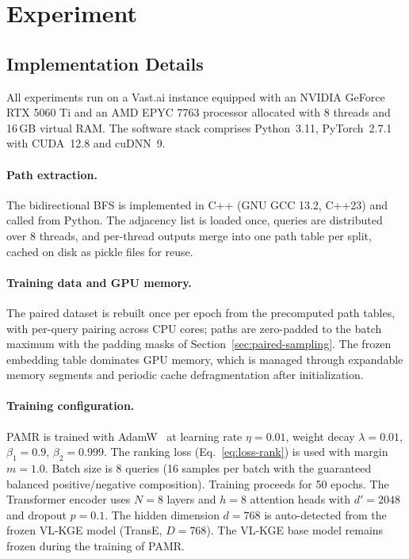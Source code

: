 \documentclass[runningheads]{llncs}
\begin{document}
\section{Experiment}
\label{sec:experiment}
\subsection{Implementation Details}
\label{sec:implementation}

All experiments run on a Vast.ai instance equipped with an NVIDIA
GeForce RTX 5060 Ti and an AMD EPYC 7763 processor allocated with 8 threads
and 16\,GB virtual RAM. The software stack comprises Python~3.11,
PyTorch~2.7.1 with CUDA~12.8 and cuDNN~9.

\paragraph{Path extraction.}
The bidirectional BFS is implemented in C++ (GNU GCC 13.2, C++23) and called
from Python. The adjacency list is loaded once, queries are distributed over 8
threads, and per-thread outputs merge into one path table per split, cached on
disk as pickle files for reuse.

\paragraph{Training data and GPU memory.}
The paired dataset is rebuilt once per epoch from the precomputed path tables,
with per-query pairing across CPU cores; paths are zero-padded to the batch
maximum with the padding masks of Section~\ref{sec:paired-sampling}. The frozen
embedding table dominates GPU memory, which is managed through expandable
memory segments and periodic cache defragmentation after initialization.

\paragraph{Training configuration.}
PAMR is trained with AdamW~\cite{loshchilov2019decoupled} at learning
rate $\eta = 0.01$, weight decay $\lambda = 0.01$, $\beta_1 = 0.9$,
$\beta_2 = 0.999$. The ranking loss (Eq.~\ref{eq:loss-rank}) is
used with margin $m = 1.0$. Batch size is 8 queries (16 samples per
batch with the guaranteed balanced positive/negative composition).
Training proceeds for 50 epochs. The Transformer encoder uses
$N = 8$ layers and $h = 8$ attention heads with
$d' = 2048$ and dropout $p = 0.1$. The hidden dimension
$d = 768$ is auto-detected from the frozen VL-KGE
model (TransE, $D = 768$). The
VL-KGE base model remains frozen during the training of PAMR.
\end{document}
